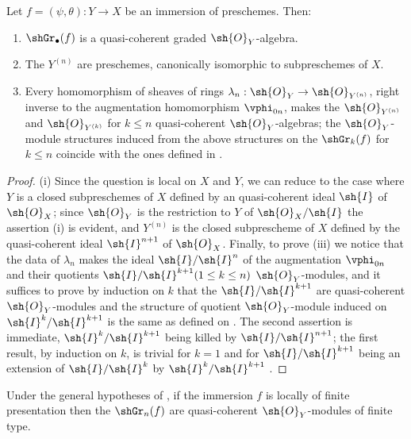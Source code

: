 \begin{proposition}[16.1.5]
\label{IV.16.1.5}
Let $f = (\psi, \theta): Y \to X$ be an immersion of preschemes.
Then:
\begin{enumerate}
  \item[{\rm(i)}] $\shGr_\bullet(f)$ is a quasi-coherent graded $\sh{O}_Y$-algebra.
  \item[{\rm(ii)}] The $Y^{(n)}$ are preschemes, canonically isomorphic to subpreschemes of $X$.
  \item[{\rm(iii)}] Every homomorphism of sheaves of rings $\lambda_n: \sh{O}_Y \to \sh{O}_{Y^{(n)}}$, right inverse to the augmentation homomorphism $\vphi_{0n}$, makes the $\sh{O}_{Y^{(n)}}$ and $\sh{O}_{Y^{(k)}}$ for $k\leq n$ quasi-coherent $\sh{O}_Y$-algebras;
  the $\sh{O}_Y$-module structures induced from the above structures on the $\shGr_k(f)$ for $k \leq n$ coincide with the ones defined in .
\end{enumerate}
\end{proposition}

\begin{proof}
(i) Since the question is local on $X$ and $Y$, we can reduce to the case where $Y$ is a closed subpreschemes of $X$ defined by an quasi-coherent ideal $\sh{I}$ of $\sh{O}_X$;
since $\sh{O}_Y$ is the restriction to $Y$ of $\sh{O}_X/\sh{I}$ the assertion (i) is evident, and $Y^{(n)}$ is the closed subprescheme of $X$ defined by the quasi-coherent ideal $\sh{I}^{n+1}$ of $\sh{O}_X$.
Finally, to prove (iii) we notice that the data of $\lambda_n$ makes the ideal $\sh{I}/\sh{I}^n$ of the augmentation $\vphi_{0n}$ and their quotients $\sh{I}/\sh{I}^{k+1} (1\leq k \leq n)$ $\sh{O}_Y$-modules, and it suffices to prove by induction on $k$ that the $\sh{I}/\sh{I}^{k+1}$ are quasi-coherent $\sh{O}_Y$-modules and the structure of quotient $\sh{O}_Y$-module induced on $\sh{I}^k/\sh{I}^{k+1}$ is the same as defined on .
The second assertion is immediate, $\sh{I}^k/\sh{I}^{k+1}$ being killed by $\sh{I}/\sh{I}^{n+1}$;
the first result, by induction on $k$, is trivial for $k=1$ and for $\sh{I}/\sh{I}^{k+1}$ being an extension of $\sh{I}/\sh{I}^{k}$ by $\sh{I}^k/\sh{I}^{k+1}$ .
\end{proof}

\begin{corollary}[16.1.6]
\label{IV.16.1.6}
Under the general hypotheses of , if the immersion $f$ is locally of finite presentation then the $\shGr_n(f)$ are quasi-coherent $\sh{O}_Y$-modules of finite type.
\end{corollary}

